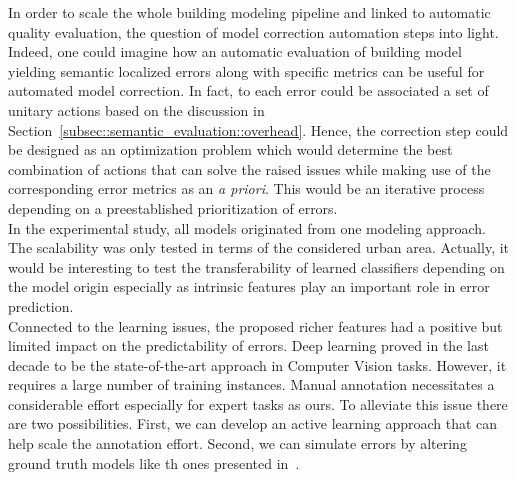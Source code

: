     In order to scale the whole building modeling pipeline and linked to automatic quality evaluation, the question of model correction automation steps into light.
    Indeed, one could imagine how an automatic evaluation of building model yielding semantic localized errors along with specific metrics can be useful for automated model correction.
    In fact, to each error could be associated a set of unitary actions based on the discussion in Section~\ref{subsec::semantic_evaluation::overhead}.
    Hence, the correction step could be designed as an optimization problem which would determine the best combination of actions that can solve the raised issues while making use of the corresponding error metrics as an \textit{a priori}.
    This would be an iterative process depending on a preestablished prioritization of errors.\\
    
    In the experimental study, all models originated from one modeling approach.
    The scalability was only tested in terms of the considered urban area.
    Actually, it would be interesting to test the transferability of learned classifiers depending on the model origin especially as intrinsic features play an important role in error prediction.\\

    Connected to the learning issues, the proposed richer features had a positive but limited impact on the predictability of errors.
    Deep learning proved in the last decade to be the state-of-the-art approach in Computer Vision tasks.
    However, it requires a large number of training instances.
    Manual annotation necessitates a considerable effort especially for expert tasks as ours.
    To alleviate this issue there are two possibilities.
    First, we can develop an active learning approach that can help scale the annotation effort.
    Second, we can simulate errors by altering ground truth models like th ones presented in~\parencite{rottensteiner2012isprs}.
